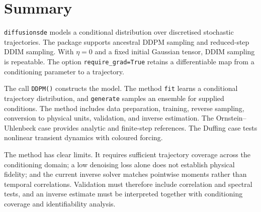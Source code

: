 \section{Summary}
\label{sec:summary}

\texttt{diffusionsde} models a conditional distribution over discretised
stochastic trajectories. The package supports ancestral DDPM sampling and
reduced-step DDIM sampling. With $\eta=0$ and a fixed initial Gaussian tensor,
DDIM sampling is repeatable. The option \texttt{require\_grad=True} retains a
differentiable map from a conditioning parameter to a trajectory.

The call \texttt{DDPM()} constructs the model. The method \texttt{fit} learns a
conditional trajectory distribution, and \texttt{generate} samples an ensemble
for supplied conditions. The method includes data preparation, training, reverse
sampling, conversion to physical units, validation, and inverse estimation. The
Ornstein--Uhlenbeck case
provides analytic and finite-step references. The Duffing case tests nonlinear
transient dynamics with coloured forcing.

The method has clear limits. It requires sufficient trajectory coverage across the
conditioning domain; a low denoising loss alone does not establish physical
fidelity; and the current inverse solver matches pointwise moments rather than
temporal correlations. Validation must therefore include correlation and spectral
tests, and an inverse estimate must be interpreted together with conditioning
coverage and identifiability analysis.
